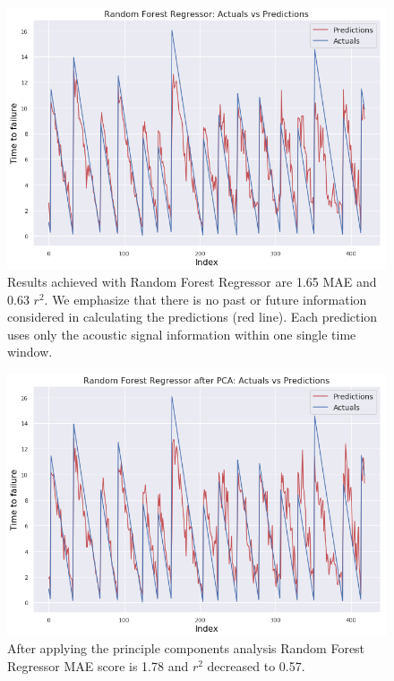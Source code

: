 \documentclass[]{llncs} %
\begin{document}
\par

\begin{figure}
	\centering
	\includegraphics[width=.9\linewidth]{results1}
	\caption{Results achieved with Random Forest Regressor are 1.65 MAE and 0.63 $r^2$. We emphasize that there is no past or future information considered in calculating the predictions (red line). Each prediction uses only the acoustic signal information within one single time window.}
	\label{fig:results1}
\end{figure}

\begin{figure}
	\centering
	\includegraphics[width=.9\linewidth]{results1PCA}
	\caption{After applying the principle components analysis Random Forest Regressor MAE score is 1.78 and $r^2$ decreased to 0.57.}
	\label{fig:results1PCA}
\end{figure}
\end{document}
